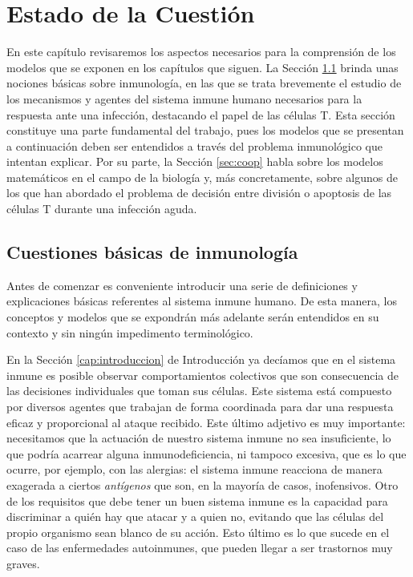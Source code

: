 \chapter{Estado de la Cuestión}
\label{cap:estadoDeLaCuestion}


En este capítulo revisaremos los aspectos necesarios para la comprensión de los modelos que se exponen en los capítulos que siguen. La Sección \ref{sec:cuestInmuno} brinda unas nociones básicas sobre inmunología, en las que se trata brevemente el estudio de los mecanismos y agentes del sistema inmune humano necesarios para la respuesta ante una infección, destacando el papel de las células T. Esta sección constituye una parte fundamental del trabajo, pues los modelos que se presentan a continuación deben ser entendidos a través del problema inmunológico que intentan explicar. Por su parte, la Sección \ref{sec:coop} habla sobre los modelos matemáticos en el campo de la biología y, más concretamente, sobre algunos de los que han abordado el problema de decisión entre división o apoptosis de las células T durante una infección aguda. 


\section{Cuestiones básicas de inmunología}
\label{sec:cuestInmuno}

Antes de comenzar es conveniente introducir una serie de definiciones y explicaciones básicas referentes al sistema inmune humano. De esta manera, los conceptos y modelos que se expondrán más adelante serán entendidos en su contexto y sin ningún impedimento terminológico.

En la Sección \ref{cap:introduccion} de Introducción ya decíamos que en el sistema inmune es posible observar comportamientos colectivos que son consecuencia de las decisiones individuales que toman sus células. Este sistema está compuesto por diversos agentes que trabajan de forma coordinada para dar una respuesta eficaz y proporcional al ataque recibido. Este último adjetivo es muy importante: necesitamos que la actuación de nuestro sistema inmune no sea insuficiente, lo que podría acarrear alguna inmunodeficiencia, ni tampoco excesiva, que es lo que ocurre, por ejemplo, con las alergias: el sistema inmune reacciona de manera exagerada a ciertos \textit{antígenos} que son, en la mayoría de casos, inofensivos. Otro de los requisitos que debe tener un buen sistema inmune es la capacidad para discriminar a quién hay que atacar y a quien no, evitando que las células del propio organismo sean blanco de su acción. Esto último es lo que sucede en el caso de las enfermedades autoinmunes, que pueden llegar a ser trastornos muy graves.

